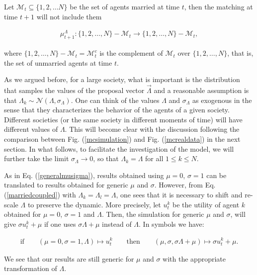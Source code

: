 \documentclass[12pt]{article}
\begin{document}
\noindent Let $\mathcal{M}_{t}\subseteq\{1,2,\dots N\}$ be the set of agents married at time $t$, then the matching at time $t+1$ will not include them

\begin{align}
    \mu_{t+1}^\Lambda:\{1,2,\dots,N\}-\mathcal{M}_{t}\rightarrow\{1,2,\dots,N\}-\mathcal{M}_{t},
    \label{marriedcouples}
\end{align}

\noindent where $\{1,2,\dots,N\}-\mathcal{M}_{t}=\mathcal{M}^c_t$ is the complement of $\mathcal{M}_t$ over $\{1,2,\dots,N\}$, that is, the set of unmarried agents at time $t$.

As we argued before, for a large society, what is important is the distribution that samples the values of the proposal vector $\vec{\Lambda}$ and a reasonable assumption is that $\Lambda_k\sim\mathcal{N}(\Lambda,\sigma_\Lambda)$. One can think of the values $\Lambda$ and $\sigma_\Lambda$ as exogenous in the sense that they characterizes the behavior of the agents of a given society. Different societies (or the same society in different moments of time) will have different values of $\Lambda$. This will become clear with the discussion following the comparison between Fig. (\ref{mcsimulation}) and Fig. (\ref{mcrealdata}) in the next section. In what follows, to facilitate the investigation of the model, we will further take the limit $\sigma_\Lambda\rightarrow0$, so that $\Lambda_k=\Lambda$ for all $1\leq k\leq N$.

As in Eq. (\ref{generalmusigma}), results obtained using $\mu=0$, $\sigma=1$ can be translated to results obtained for generic $\mu$ and $\sigma$. However, from Eq. (\ref{marriedcoupled}) with $\Lambda_k=\Lambda_l=\Lambda$, one sees that it is necessary to shift and re-scale $\Lambda$ to preserve the dynamic. More precisely, let $u_t^k$ be the utility of agent $k$ obtained for $\mu=0$, $\sigma=1$ and $\Lambda$. Then, the simulation for generic $\mu$ and $\sigma$, will give $\sigma u_t^k+\mu$ if one uses $\sigma\Lambda+\mu$ instead of $\Lambda$. In symbols we have:

\begin{align}
    \textrm{if}\qquad (\mu=0,\sigma=1,\Lambda)\mapsto u_t^k\qquad\textrm{then}\qquad (\mu,\sigma,\sigma\Lambda+\mu)\mapsto \sigma u_t^k+\mu.
    \label{dictionarymarried}
\end{align}

\noindent We see that our results are still generic for $\mu$ and $\sigma$ with the appropriate transformation of $\Lambda$.
\end{document}
